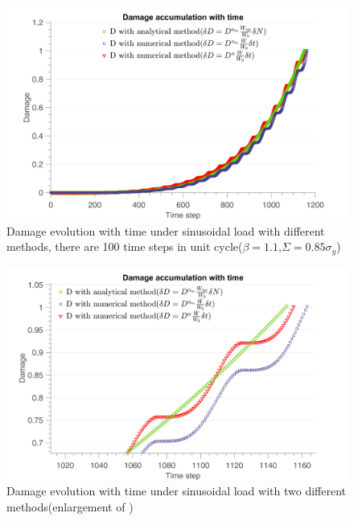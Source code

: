 \begin{figure}[!h]
\centering
\includegraphics[width=\textwidth]{figures//D_3methods2_100steps.png} 
\caption{Damage evolution with time under sinusoidal load with different methods, there are 100 time steps in unit cycle($\beta=1.1$,$\Sigma=0.85\sigma_y$)}
\label{fig.damsin100}
\end{figure}

\begin{figure}[!h]
\centering
\includegraphics[width=\textwidth]{figures//D_3methods_100steps_enlarge.png} 
\caption{Damage evolution with time under sinusoidal load with two different methods(enlargement of )}
\label{damsinenglarge}
\end{figure}

